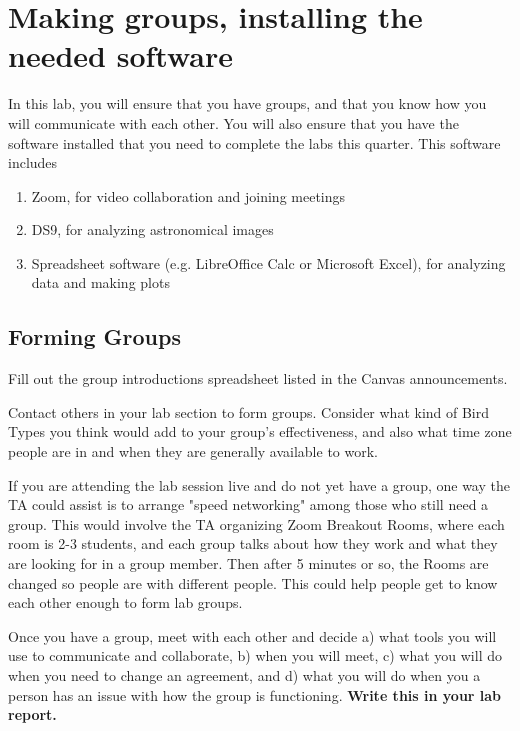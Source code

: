 \chapter{Making groups, installing the needed software}


In this lab, you will ensure that you have groups, and that you know how you will communicate with each other. You will also ensure that you have the software installed that you need to complete the labs this quarter. This software includes
\begin{enumerate}
	\item Zoom, for video collaboration and joining meetings
	\item DS9, for analyzing astronomical images
	\item Spreadsheet software (e.g. LibreOffice Calc or Microsoft Excel), for analyzing data and making plots
\end{enumerate}

\section{Forming Groups}

\begin{steps}
 \item Fill out the group introductions spreadsheet listed in the Canvas announcements.
 
 \item Contact others in your lab section to form groups. Consider what kind of Bird Types you think would add to your group's effectiveness, and also what time zone people are in and when they are generally available to work.
\end{steps}

If you are attending the lab session live and do not yet have a group, one way the TA could assist is to arrange "speed networking" among those who still need a group. This would involve the TA organizing Zoom Breakout Rooms, where each room is 2-3 students, and each group talks about how they work and what they are looking for in a group member. Then after 5 minutes or so, the Rooms are changed so people are with different people. This could help people get to know each other enough to form lab groups.

\begin{steps}
	\item Once you have a group, meet with each other and decide a) what tools you will use to communicate and collaborate, b) when you will meet, c) what you will do when you need to change an agreement, and d) what you will do when you a person has an issue with how the group is functioning. \textbf{Write this in your lab report.} %
\end{steps}

